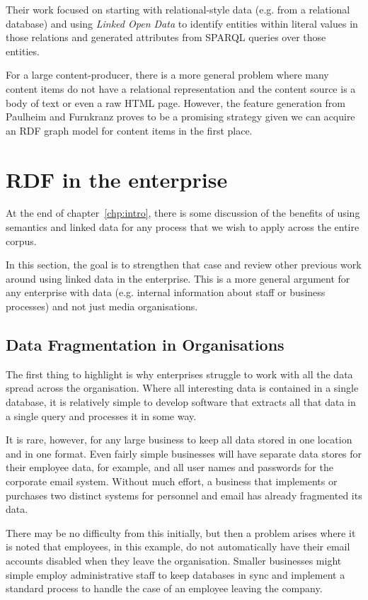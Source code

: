 Their work focused on starting with relational-style data (e.g. from a
relational database) and using \emph{Linked Open Data} to identify entities
within literal values in those relations and generated attributes from
SPARQL queries over those entities.

For a large content-producer, there is a more general problem where many content
items do not have a relational representation and the content source is a body
of text or even a raw HTML page. However, the feature generation from Paulheim
and F\:urnkranz proves to be a promising strategy given we can acquire an RDF
graph model for content items in the first place.

\section{RDF in the enterprise}
\label{sec:linked-enterprise-data}

At the end of chapter~\ref{chp:intro}, there is some discussion of the
benefits of using semantics and linked data for any process that we wish
to apply across the entire corpus.

In this section, the goal is to strengthen that case and review other
previous work around using linked data in the enterprise. This is a more
general argument for any enterprise with data (e.g. internal information
about staff or business processes) and not just media organisations.

\subsection{Data Fragmentation in Organisations}

The first thing to highlight is why enterprises struggle to work with all
the data spread across the organisation. Where all interesting data is
contained in a single database, it is relatively simple to develop software
that extracts all that data in a single query and processes it in some way.

It is rare, however, for any large business to keep all data stored in
one location and in one format. Even fairly simple businesses will have
separate data stores for their employee data, for example, and all
user names and passwords for the corporate email system. Without much effort,
a business that implements or purchases two distinct systems for personnel
and email has already fragmented its data.

There may be no difficulty from this initially, but then a problem arises
where it is noted that employees, in this example, do not automatically have
their email accounts disabled when they leave the organisation. Smaller
businesses might simple employ administrative staff to keep databases in
sync and implement a standard process to handle the case of an employee
leaving the company.

